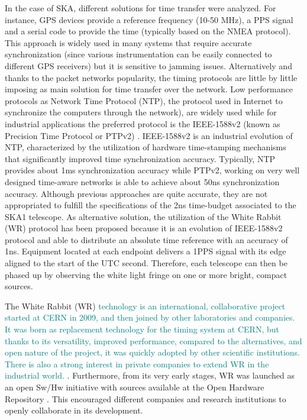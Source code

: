 In the case of SKA, different solutions for time transfer were analyzed. For instance, GPS devices provide a reference frequency (10-50 MHz), a PPS signal and a serial code to provide the time (typically based on the NMEA protocol). This approach is widely used in many systems that require accurate synchronization (since various instrumentation can be easily connected to different GPS receivers) but it is sensitive to jamming issues. Alternatively and thanks to the packet networks popularity, the timing protocols are little by little imposing as main solution for time transfer over the network. Low performance protocols as Network Time Protocol (NTP), the protocol used in Internet to synchronize the computers through the network), \cite{ntf:ntp_std} are widely used while for industrial applications the preferred protocol is the IEEE-1588v2 (known as Precision Time Protocol or PTPv2) \cite{ieee:ieee1588_std} \cite{itu:TG8275_1_Y_1369_1}. IEEE-1588v2 is an industrial evolution of NTP, characterized by the utilization of hardware time-stamping mechanisms that significantly improved time synchronization accuracy. Typically, NTP provides about 1ms synchronization accuracy while PTPv2, working on very well designed time-aware networks is able to achieve about 50ns synchronization accuracy. 
Although previous approaches are quite accurate, they are not appropriated to fulfill the specifications of the 2ns time-budget associated to the SKA1 telescope. As alternative solution, the utilization of the White Rabbit (WR) protocol has been proposed because it is an evolution of IEEE-1588v2 protocol and able to distribute an absolute time reference with an accuracy of 1ns. Equipment located at each endpoint delivers a 1PPS signal with its edge aligned to the start of the UTC second. Therefore, each telescope can then be phased up by observing the white light fringe on one or more bright, compact sources.

The White Rabbit (WR)  \textcolor{teal}{technology is an international, collaborative project started at CERN in 2009, and then joined by other laboratories and companies. It was born as replacement technology for the timing system at CERN, but thanks to its versatility, improved performance, compared to the alternatives, and open nature of the project, it was quickly adopted by other scientific institutions. There is also a strong interest in private companies to extend WR in the  industrial world. }. Furthermore, from its very early stages, WR was launched as an open Sw/Hw initiative with sources available at the Open Hardware Repository \cite{ohwr:repo}. This encouraged different companies and research institutions to openly collaborate in its development.


